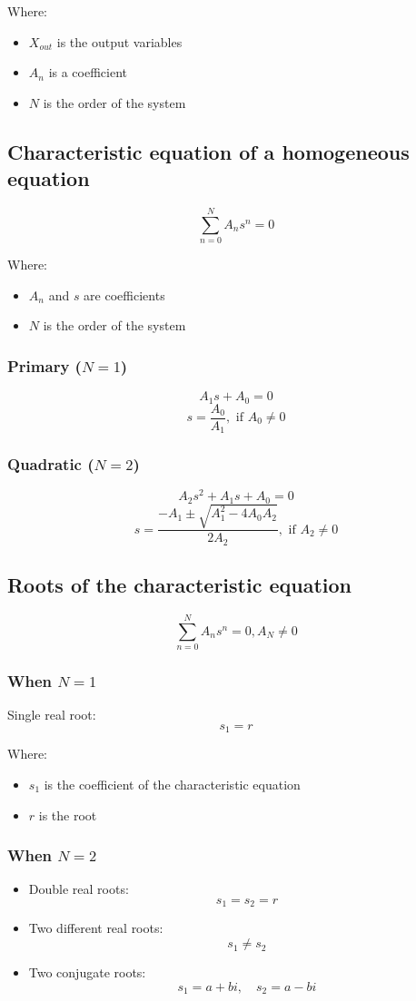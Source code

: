 \documentclass[11pt]{article}
\begin{document}
Where:
\begin{itemize}
\item \(X_{out}\) is the output variables
\item \(A_n\) is a coefficient
\item \(N\) is the order of the system
\end{itemize}
\subsection{Characteristic equation of a homogeneous equation}
\label{sec:org025264c}
\[\sum_{n = 0}^N A_n s^n = 0\]

Where:
\begin{itemize}
\item \(A_n\) and \(s\) are coefficients
\item \(N\) is the order of the system
\end{itemize}
\subsubsection{Primary (\(N = 1\))}
\label{sec:org0e0f95a}
\[A_1 s + A_0 = 0\]
\[s = \frac{A_0}{A_1}, \text{ if } A_0 \ne 0\]
\subsubsection{Quadratic (\(N = 2\))}
\label{sec:orga0d66d0}
\[A_2 s^2 + A_1 s + A_0 = 0\]
\[s = \frac{- A_1 \pm \sqrt{A_1^2 - 4 A_0 A_2}}{2 A_2}, \text{ if } A_2 \ne 0\]
\subsection{Roots of the characteristic equation}
\label{sec:orgfb1688c}
\[\sum_{n = 0}^N A_n s^n = 0, A_N \ne 0\]
\subsubsection{When \(N = 1\)}
\label{sec:orgae356ec}
Single real root:
\[s_1 = r\]

Where:
\begin{itemize}
\item \(s_1\) is the coefficient of the characteristic equation
\item \(r\) is the root
\end{itemize}
\subsubsection{When \(N = 2\)}
\label{sec:org61663ac}
\begin{itemize}
\item Double real roots:
\[s_1 = s_2 = r\]
\item Two different real roots:
\[s_1 \ne s_2\]
\item Two conjugate roots:
\[s_1 = a + bi, \quad s_2 = a - bi\]
\end{itemize}
\end{document}
